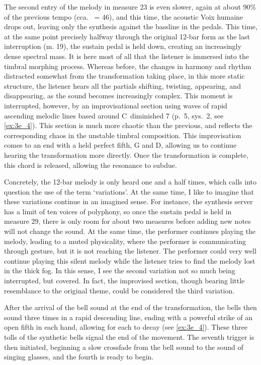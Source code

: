 \documentclass[12pt,twoside,maitrise]{dms_ks}
\theoremstyle{definition}
\begin{document}
{{The second entry of the melody in measure 23 is even slower, again at about 90\% of the previous tempo (cca. 
\musQuarter\ = 46), and this time, the acoustic Voix humaine drops out, leaving only the synthesis against the bassline in the pedals. 
This time, at the same point precisely halfway through the original 12-bar form as the last interruption (m. 
19), the sustain pedal is held down, creating an increasingly dense spectral mass. 
It is here most of all that the listener is immersed into the timbral morphing process. 
Whereas before, the changes in harmony and rhythm distracted somewhat from the transformation taking place, in this more static structure, the listener hears all the partials shifting, twisting, appearing, and disappearing, as the sound becomes increasingly complex. 
This moment is interrupted, however, by an improvisational section using waves of rapid ascending melodic lines based around C\sh\ diminished 7 (p.~5, sys.~2, see \cref{ex:3e_4}). 
This section is much more chaotic than the previous, and reflects the corresponding chaos in the unstable timbral composition. 
This improvisation comes to an end with a held perfect fifth, G and D, allowing us to continue hearing the transformation more directly. 
Once the transformation is complete, this chord is released, allowing the resonance to subdue. 

Concretely, the 12-bar melody is only heard one and a half times, which calls into question the use of the term `variations'. 
At the same time, I like to imagine that these variations continue in an imagined sense. 
For instance, the synthesis server has a limit of ten voices of polyphony, so once the sustain pedal is held in measure 29, there is only room for about two measures before adding new notes will not change the sound. 
At the same time, the performer continues playing the melody, leading to a muted physicality, where the performer is communicating through gesture, but it is not reaching the listener. 
The performer could very well continue playing this silent melody while the listener tries to find the melody lost in the thick fog. 
In this sense, I see the second variation not so much being interrupted, but covered. 
In fact, the improvised section, though bearing little resemblance to the original theme, could be considered the third variation.

After the arrival of the bell sound at the end of the transformation, the bells then sound three times in a rapid descending line, ending with a powerful strike of an open fifth in each hand, allowing for each to decay (see \cref{ex:3e_4}). 
These three tolls of the synthetic bells signal the end of the movement. 
The seventh trigger is then initiated, beginning a slow crossfade from the bell sound to the sound of singing glasses, and the fourth is ready to begin.

}}
\end{document}
